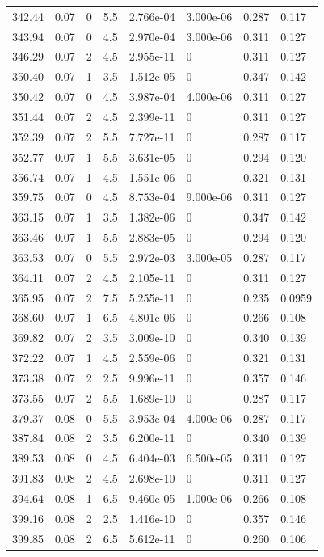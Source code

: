 \documentclass[preview]{standalone}
\begin{document}
{{{{\begin{tabular}{L{1.2cm}C{1.2cm} C{0.3cm}C{0.5cm} C{1.4cm}C{1.4cm} C{1.4cm}C{1.4cm}}
  342.44  &  0.07  & 0     & 5.5 &  2.766e-04  & 3.000e-06  & 0.287 &  0.117   \\ 
  343.94  &  0.07  & 0     & 4.5 &  2.970e-04  & 3.000e-06  & 0.311 &  0.127   \\ 
  346.29  &  0.07  & 2     & 4.5 &  2.955e-11  & 0  & 0.311 &  0.127   \\ 
  350.40  &  0.07  & 1     & 3.5 &  1.512e-05  & 0  & 0.347 &  0.142   \\ 
  350.42  &  0.07  & 0     & 4.5 &  3.987e-04  & 4.000e-06  & 0.311 &  0.127   \\ 
  351.44  &  0.07  & 2     & 4.5 &  2.399e-11  & 0  & 0.311 &  0.127   \\ 
  352.39  &  0.07  & 2     & 5.5 &  7.727e-11  & 0  & 0.287 &  0.117   \\ 
  352.77  &  0.07  & 1     & 5.5 &  3.631e-05  & 0  & 0.294 &  0.120   \\ 
  356.74  &  0.07  & 1     & 4.5 &  1.551e-06  & 0  & 0.321 &  0.131   \\ 
  359.75  &  0.07  & 0     & 4.5 &  8.753e-04  & 9.000e-06  & 0.311 &  0.127   \\ 
  363.15  &  0.07  & 1     & 3.5 &  1.382e-06  & 0  & 0.347 &  0.142   \\ 
  363.46  &  0.07  & 1     & 5.5 &  2.883e-05  & 0  & 0.294 &  0.120   \\ 
  363.53  &  0.07  & 0     & 5.5 &  2.972e-03  & 3.000e-05  & 0.287 &  0.117   \\ 
  364.11  &  0.07  & 2     & 4.5 &  2.105e-11  & 0  & 0.311 &  0.127   \\ 
  365.95  &  0.07  & 2     & 7.5 &  5.255e-11  & 0  & 0.235 &  0.0959   \\ 
  368.60  &  0.07  & 1     & 6.5 &  4.801e-06  & 0  & 0.266 &  0.108   \\ 
  369.82  &  0.07  & 2     & 3.5 &  3.009e-10  & 0  & 0.340 &  0.139   \\ 
  372.22  &  0.07  & 1     & 4.5 &  2.559e-06  & 0  & 0.321 &  0.131   \\ 
  373.38  &  0.07  & 2     & 2.5 &  9.996e-11  & 0  & 0.357 &  0.146   \\ 
  373.55  &  0.07  & 2     & 5.5 &  1.689e-10  & 0  & 0.287 &  0.117   \\ 
  379.37  &  0.08  & 0     & 5.5 &  3.953e-04  & 4.000e-06  & 0.287 &  0.117   \\ 
  387.84  &  0.08  & 2     & 3.5 &  6.200e-11  & 0  & 0.340 &  0.139   \\ 
  389.53  &  0.08  & 0     & 4.5 &  6.404e-03  & 6.500e-05  & 0.311 &  0.127   \\ 
  391.83  &  0.08  & 2     & 4.5 &  2.698e-10  & 0  & 0.311 &  0.127   \\ 
  394.64  &  0.08  & 1     & 6.5 &  9.460e-05  & 1.000e-06  & 0.266 &  0.108   \\ 
  399.16  &  0.08  & 2     & 2.5 &  1.416e-10  & 0  & 0.357 &  0.146   \\ 
  399.85  &  0.08  & 2     & 6.5 &  5.612e-11  & 0  & 0.260 &  0.106   \\ 
\hline 
\end{tabular} 

}}}}
\end{document}

